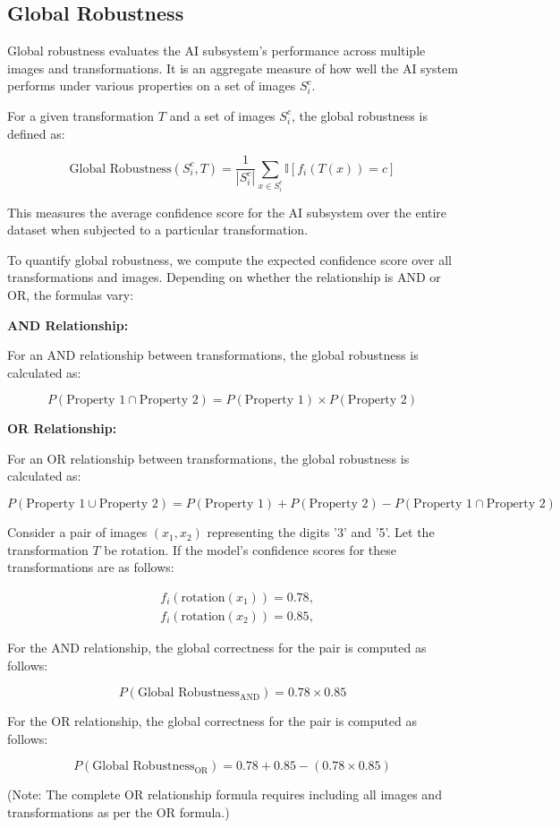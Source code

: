 \subsection{Global Robustness}

Global robustness evaluates the AI subsystem's performance across multiple images and transformations. It is an aggregate measure of how well the AI system performs under various properties on a set of images $S_i^c$.

For a given transformation $T$ and a set of images $S_i^c$, the global robustness is defined as:

$$ \text{Global Robustness}(S_i^c, T) = \frac{1}{|S_i^c|} \sum_{x \in S_i^c} \mathbb{I}[f_i(T(x)) = c] $$

This measures the average confidence score for the AI subsystem over the entire dataset when subjected to a particular transformation.

To quantify global robustness, we compute the expected confidence score over all transformations and images. Depending on whether the relationship is AND or OR, the formulas vary:

\textbf{AND Relationship:}

For an AND relationship between transformations, the global robustness is calculated as:

$$ P(\text{Property 1} \cap \text{Property 2}) = P(\text{Property 1}) \times P(\text{Property 2}) $$

\textbf{OR Relationship:}

For an OR relationship between transformations, the global robustness is calculated as:

$$ P(\text{Property 1} \cup \text{Property 2}) = P(\text{Property 1}) + P(\text{Property 2}) - P(\text{Property 1} \cap \text{Property 2}) $$

\begin{example}
Consider a pair of images $(x_1, x_2)$ representing the digits '3' and '5'. Let the transformation $T$ be rotation. If the model's confidence scores for these transformations are as follows:

$$
\begin{aligned}
&f_i(\text{rotation}(x_1)) = 0.78, \\
&f_i(\text{rotation}(x_2)) = 0.85,
\end{aligned}
$$

For the AND relationship, the global correctness for the pair is computed as follows:

$$P(\text{Global Robustness}_{\text{AND}}) = 0.78 \times 0.85$$

For the OR relationship, the global correctness for the pair is computed as follows:

$$P(\text{Global Robustness}_{\text{OR}}) = 0.78 + 0.85 - (0.78 \times 0.85)$$

(Note: The complete OR relationship formula requires including all images and transformations as per the OR formula.)

\end{example}

